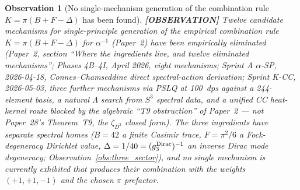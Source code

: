 \documentclass[11pt]{article}
\newtheorem{observation}{Observation}
\begin{document}

\begin{observation}[No single-mechanism generation of the combination rule $K = \pi(B + F - \Delta)$ has been found]
\label{obs:no_single_mechanism_K}
\textbf{[OBSERVATION]} Twelve candidate mechanisms for single-principle
generation of the empirical combination rule $K = \pi(B + F - \Delta)$
for $\alpha^{-1}$ (Paper~2) have been empirically eliminated (Paper~2,
section ``Where the ingredients live, and twelve eliminated
mechanisms''; Phases 4B--4I, April 2026, eight mechanisms; Sprint A
$\alpha$-SP, 2026-04-18, Connes--Chamseddine direct spectral-action
derivation; Sprint K-CC, 2026-05-03, three further mechanisms via PSLQ
at 100~dps against a 244-element basis, a natural $\Lambda$ search from
$S^3$ spectral data, and a unified CC heat-kernel route blocked by the
algebraic ``T9 obstruction'' of Paper~2 --- not Paper~28's Theorem~T9, the $\zeta_{D^2}$ closed form).  The three ingredients
have separate spectral homes ($B = 42$ a finite Casimir trace, $F =
\pi^2/6$ a Fock-degeneracy Dirichlet value, $\Delta = 1/40 =
(g_3^{\rm Dirac})^{-1}$ an inverse Dirac mode degeneracy;
Observation~\ref{obs:three_sector}), and no single mechanism is
currently exhibited that produces their combination with the weights
$(+1, +1, -1)$ and the chosen $\pi$ prefactor.
\end{observation}
\end{document}
